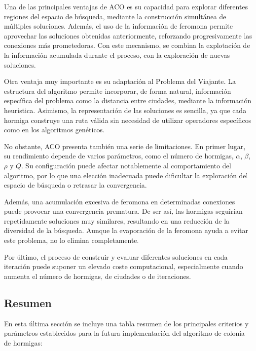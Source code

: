 Una de las principales ventajas de ACO es su capacidad para explorar diferentes regiones del espacio de búsqueda, mediante
la construcción simultánea de múltiples soluciones. Además, el uso de la información de feromona permite aprovechar las
soluciones obtenidas anteriormente, reforzando progresivamente las conexiones más prometedoras. Con este mecanismo, se 
combina la explotación de la información acumulada durante el proceso, con la exploración de nuevas soluciones.

Otra ventaja muy importante es su adaptación al Problema del Viajante. La estructura del algoritmo permite incorporar, de 
forma natural, información específica del problema como la distancia entre ciudades, mediante la información heurística.
Asimismo, la representación de las soluciones es sencilla, ya que cada hormiga construye una ruta válida sin necesidad de 
utilizar operadores específicos como en los algoritmos genéticos.

No obstante, ACO presenta también una serie de limitaciones. En primer lugar, su rendimiento depende de varios parámetros,
como el número de hormigas, $\alpha$, $\beta$, $\rho$ y $Q$. Su configuración puede afectar notablemente al comportamiento
del algoritmo, por lo que una elección inadecuada puede dificultar la exploración del espacio de búsqueda o retrasar la 
convergencia.

Además, una acumulación excesiva de feromona en determinadas conexiones puede provocar una convergencia prematura. De ser 
así, las hormigas seguirían repetidamente soluciones muy similares, resultando en una reducción de la diversidad de la 
búsqueda. Aunque la evaporación de la feromona ayuda a evitar este problema, no lo elimina completamente.

Por último, el proceso de construir y evaluar diferentes soluciones en cada iteración puede suponer un elevado coste
computacional, especialmente cuando aumenta el número de hormigas, de ciudades o de iteraciones.

\subsection{Resumen}
\label{subsec:aco_summary}

En esta última sección se incluye una tabla resumen de los principales criterios y parámetros establecidos para la futura
implementación del algoritmo de colonia de hormigas:

